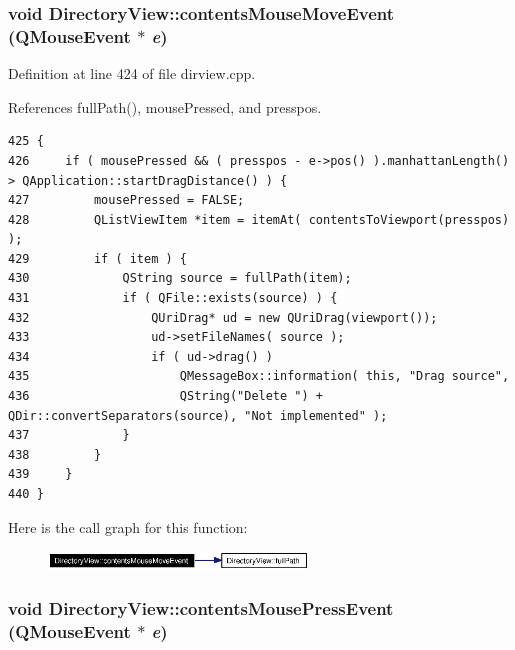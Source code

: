 \subsubsection{\setlength{\rightskip}{0pt plus 5cm}void Directory\-View::contents\-Mouse\-Move\-Event (QMouse\-Event $\ast$ {\em e})\hspace{0.3cm}{\tt  [protected]}}\label{classDirectoryView_DirectoryViewb4}




Definition at line 424 of file dirview.cpp.

References full\-Path(), mouse\-Pressed, and presspos.



\footnotesize\begin{verbatim}425 {
426     if ( mousePressed && ( presspos - e->pos() ).manhattanLength() > QApplication::startDragDistance() ) {
427         mousePressed = FALSE;
428         QListViewItem *item = itemAt( contentsToViewport(presspos) );
429         if ( item ) {
430             QString source = fullPath(item);
431             if ( QFile::exists(source) ) {
432                 QUriDrag* ud = new QUriDrag(viewport());
433                 ud->setFileNames( source );
434                 if ( ud->drag() )
435                     QMessageBox::information( this, "Drag source",
436                     QString("Delete ") + QDir::convertSeparators(source), "Not implemented" );
437             }
438         }
439     }
440 }
\end{verbatim}\normalsize 


Here is the call graph for this function:\begin{figure}[H]
\begin{center}
\leavevmode
\includegraphics[width=196pt]{classDirectoryView_DirectoryViewb4_cgraph}
\end{center}
\end{figure}
\subsubsection{\setlength{\rightskip}{0pt plus 5cm}void Directory\-View::contents\-Mouse\-Press\-Event (QMouse\-Event $\ast$ {\em e})\hspace{0.3cm}{\tt  [protected]}}\label{classDirectoryView_DirectoryViewb5}




